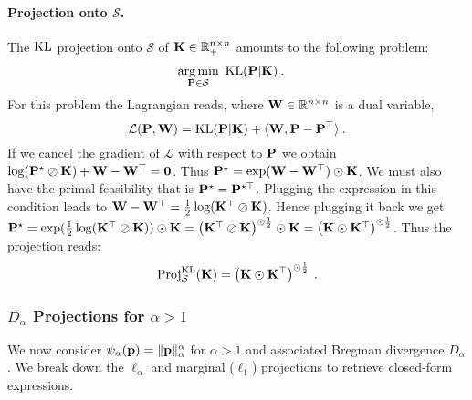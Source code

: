     \paragraph{Projection onto $\mathcal{S}$.} The $\operatorname{KL}$ projection onto $\mathcal{S}$ of ${\mathbf{K}} \in \mathbb{R}_+^{n \times n}$ amounts to the following problem:
    \begin{align}
        \operatorname*{arg\,min}_{{\mathbf{P}} \in \mathcal{S}} \ &\operatorname{KL}({\mathbf{P}} | {\mathbf{K}}) \:.
    \end{align}
    For this problem the Lagrangian reads, where ${\mathbf{W}} \in \mathbb{R}^{n \times n}$ is a dual variable, 
    \begin{equation}
    \mathcal{L}({\mathbf{P}}, {\mathbf{W}}) = \operatorname{KL}({\mathbf{P}} | {\mathbf{K}}) + \langle {\mathbf{W}}, {\mathbf{P}} -{\mathbf{P}}^{\top} \rangle \:.
    \end{equation}
    If we cancel the gradient of $\mathcal{L}$ with respect to ${\mathbf{P}}$ we obtain $\log({\mathbf{P}}^\star \oslash {\mathbf{K}}) + {\mathbf{W}} - {\mathbf{W}}^\top = \bm{0}$. Thus ${\mathbf{P}}^\star = \exp( {\mathbf{W}}-{\mathbf{W}}^\top) \odot {\mathbf{K}}$. 
    We must also have the primal feasibility that is ${\mathbf{P}}^\star = {\mathbf{P}}^{\star \top}$. Plugging the expression in this condition leads to ${\mathbf{W}} - {\mathbf{W}}^\top= \frac{1}{2} \log({\mathbf{K}}^\top \oslash {\mathbf{K}})$. Hence plugging it back we get ${\mathbf{P}}^\star = \exp( \frac{1}{2} \log({\mathbf{K}}^\top \oslash {\mathbf{K}})) \odot {\mathbf{K}} = \left({\mathbf{K}}^\top \oslash {\mathbf{K}} \right)^{\odot \frac {1}{2}} \odot {\mathbf{K}} = \left({\mathbf{K}} \odot {\mathbf{K}}^{\top}\right)^{\odot \frac {1}{2}}$. Thus the projection reads:
    \begin{equation}
        \operatorname{Proj}^{\operatorname{KL}}_{\mathcal{S}}(\mathbf{K}) = \left({\mathbf{K}} \odot {\mathbf{K}}^{\top}\right)^{\odot \frac{1}{2}} \:.
    \end{equation}

    
    \subsubsection{$D_\alpha$ Projections for $\alpha > 1$}

    We now consider $\psi_{\alpha}({\mathbf{p}}) = \| {\mathbf{p}} \|_{\alpha}^{\alpha}$ for $\alpha>1$ and associated Bregman divergence $D_{\alpha}$.
    We break down the $\ell_{\alpha}$ and marginal ($\ell_1$) projections to retrieve closed-form expressions.

